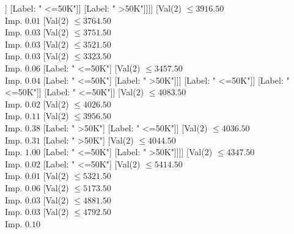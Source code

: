 \documentclass[margin=10pt]{standalone}
\begin{document}
\begin{forest}
																							[Val($2$) $ \leq 3092.50$ \\ Imp. $0.31$
																								[Val($2$) $ \leq 3090.50$ \\ Imp. $1.00$
																									[Label: " <=50K"]
																									[Label: " >50K"]]
																								[Label: " <=50K"]]
																							[Label: " >50K"]]]]
																				[Val($2$) $ \leq 3916.50$ \\ Imp. $0.01$
																					[Val($2$) $ \leq 3764.50$ \\ Imp. $0.03$
																						[Val($2$) $ \leq 3751.50$ \\ Imp. $0.03$
																							[Val($2$) $ \leq 3521.50$ \\ Imp. $0.03$
																								[Val($2$) $ \leq 3323.50$ \\ Imp. $0.06$
																									[Label: " <=50K"]
																									[Val($2$) $ \leq 3457.50$ \\ Imp. $0.04$
																										[Label: " <=50K"]
																										[Label: " >50K"]]]
																								[Label: " <=50K"]]
																							[Label: " <=50K"]]
																						[Label: " <=50K"]]
																					[Val($2$) $ \leq 4083.50$ \\ Imp. $0.02$
																						[Val($2$) $ \leq 4026.50$ \\ Imp. $0.11$
																							[Val($2$) $ \leq 3956.50$ \\ Imp. $0.38$
																								[Label: " >50K"]
																								[Label: " <=50K"]]
																							[Val($2$) $ \leq 4036.50$ \\ Imp. $0.31$
																								[Label: " >50K"]
																								[Val($2$) $ \leq 4044.50$ \\ Imp. $1.00$
																									[Label: " <=50K"]
																									[Label: " >50K"]]]]
																						[Val($2$) $ \leq 4347.50$ \\ Imp. $0.02$
																							[Label: " <=50K"]
																							[Val($2$) $ \leq 5414.50$ \\ Imp. $0.01$
																								[Val($2$) $ \leq 5321.50$ \\ Imp. $0.06$
																									[Val($2$) $ \leq 5173.50$ \\ Imp. $0.03$
																										[Val($2$) $ \leq 4881.50$ \\ Imp. $0.03$
																											[Val($2$) $ \leq 4792.50$ \\ Imp. $0.10$

\end{forest}
\end{document}
